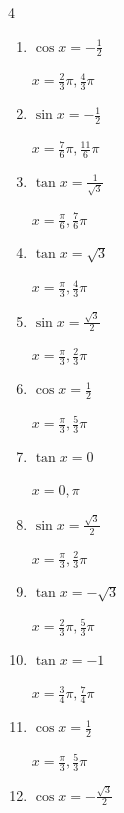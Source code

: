 \begin{multicols}{4}
\begin{enumerate}
  \item $\displaystyle \cos{x}  = -\frac{1}{2}$

        $\displaystyle x = \frac{2}{3}\pi , \frac{4}{3}\pi$

  \item $\displaystyle \sin{x}  = -\frac{1}{2}$

        $\displaystyle x = \frac{7}{6}\pi , \frac{11}{6}\pi$

\columnbreak %

  \item $\displaystyle \tan{x}  = \frac{1}{\sqrt{3}}$

        $\displaystyle x = \frac{\pi}{6} , \frac{7}{6}\pi$

  \item $\displaystyle \tan{x}  = \sqrt{3}$

        $\displaystyle x = \frac{\pi}{3} , \frac{4}{3}\pi$

  \item $\displaystyle \sin{x}  = \frac{\sqrt{3}}{2}$

        $\displaystyle x = \frac{\pi}{3} , \frac{2}{3}\pi$

  \item $\displaystyle \cos{x}  = \frac{1}{2}$

        $\displaystyle x = \frac{\pi}{3} , \frac{5}{3}\pi$

  \item $\displaystyle \tan{x}  = 0$

        $\displaystyle x = 0 , \pi$

  \item $\displaystyle \sin{x}  = \frac{\sqrt{3}}{2}$

        $\displaystyle x = \frac{\pi}{3} , \frac{2}{3}\pi$

  \item $\displaystyle \tan{x}  = -\sqrt{3}$

        $\displaystyle x = \frac{2}{3}\pi , \frac{5}{3}\pi$

  \item $\displaystyle \tan{x}  = -1$

        $\displaystyle x = \frac{3}{4}\pi , \frac{7}{4}\pi$

  \item $\displaystyle \cos{x}  = \frac{1}{2}$

        $\displaystyle x = \frac{\pi}{3} , \frac{5}{3}\pi$

  \item $\displaystyle \cos{x}  = -\frac{\sqrt{3}}{2}$


\end{enumerate}
\end{multicols}

